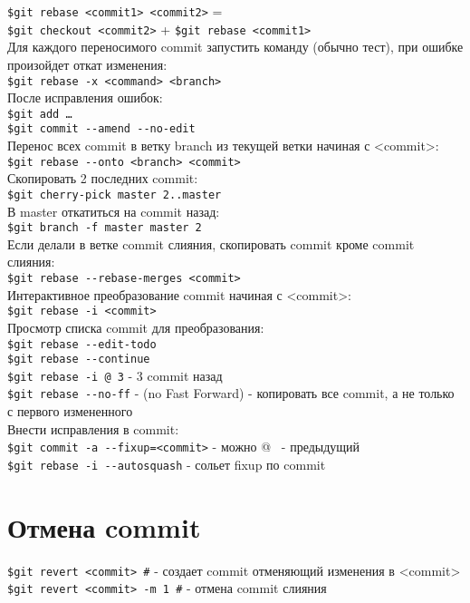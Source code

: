 \documentclass[12pt, a4paper]{article}
\begin{document}
\noindent\texttt{\$git rebase <commit1> <commit2>} = \\
\indent\indent \texttt{\$git checkout <commit2>} + \texttt{\$git rebase <commit1>} \\

\noindent Для каждого переносимого commit запустить команду (обычно тест), при ошибке произойдет откат изменения: \\
\indent\texttt{\$git rebase -x <command> <branch>} \\
\noindent После исправления ошибок: \\
\indent\texttt{\$git add \ldots} \\
\indent\texttt{\$git commit {-}-amend {-}-no-edit} \\

\noindent Перенос всех commit в ветку branch из текущей ветки начиная с <commit>: \\
\indent \texttt{\$git rebase {-}-onto <branch> <commit>}  \\

\noindent Скопировать 2 последних commit: \\
\indent \texttt{\$git cherry-pick master~2..master \indent} \\
\noindent В master откатиться на commit назад: \\
\indent \texttt{\$git branch -f master master~2} \\

\noindent Если делали в ветке commit слияния, скопировать commit кроме commit слияния: \\
\indent \texttt{\$git rebase {-}-rebase-merges <commit>} \\

\noindent Интерактивное преобразование commit начиная с <commit>: \\
\indent \texttt{\$git rebase -i <commit>}  \\
\noindent Просмотр списка commit для преобразования: \\
\indent \texttt{\$git rebase {-}-edit-todo}  \\

\noindent \texttt{\$git rebase {-}-continue} \\
\noindent \texttt{\$git rebase -i @~3} - 3 commit назад \\
\noindent \texttt{\$git rebase {-}-no-ff}  - (no Fast Forward) - копировать все commit, а не только с первого измененного \\

\noindent Внести исправления в commit: \\
\indent \texttt{\$git commit -a {-}-fixup=<commit>}   - можно @~ - предыдущий \\
\indent \texttt{\$git rebase -i {-}-autosquash} - сольет fixup по commit \\





\section{Отмена commit}
\texttt{\$git revert <commit> \#} - создает commit отменяющий изменения в <commit> \\
\texttt{\$git revert <commit> -m 1 \indent \#}  - отмена commit слияния \\

	
\end{document}
